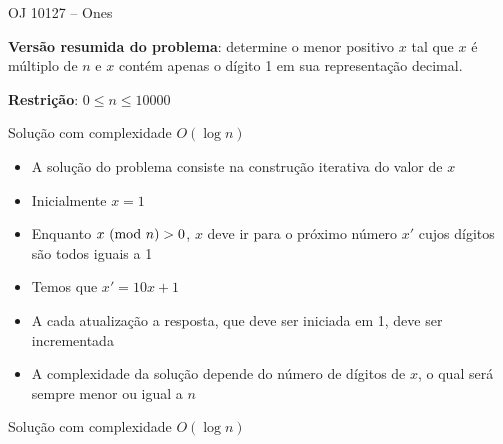 \begin{frame}[fragile]{OJ 10127 -- Ones}

    \textbf{Versão resumida do problema}: determine o menor positivo $x$ tal que $x$ é múltiplo de
        $n$ e $x$ contém apenas o dígito 1 em sua representação decimal.

    \vspace{0.1in}

    \textbf{Restrição}: $0\leq n\leq 10000$
\end{frame}

\begin{frame}[fragile]{Solução com complexidade $O(\log n)$}

    \begin{itemize}
        \item A solução do problema consiste na construção iterativa do valor de $x$

        \item Inicialmente $x = 1$

        \item Enquanto $x\ (\mbox{mod}\ n) > 0$, $x$ deve ir para o próximo número $x'$ cujos dígitos são
            todos iguais a 1

        \item Temos que $x' = 10x + 1$

        \item A cada atualização a resposta, que deve ser iniciada em 1, deve ser incrementada

        \item A complexidade da solução depende do número de dígitos de $x$, o qual será sempre
            menor ou igual a $n$

    \end{itemize}

\end{frame}

\begin{frame}[fragile]{Solução com complexidade $O(\log n)$}
\end{frame}
